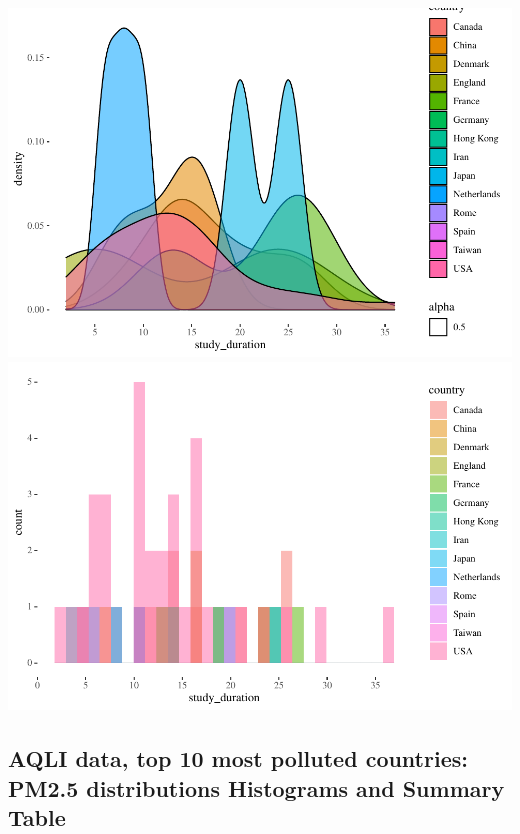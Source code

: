 \documentclass[
]{article}
\begin{document}
\includegraphics[width=1\linewidth]{man/figures/README-study_duration_dist_country_wise-1}
\includegraphics[width=1\linewidth]{man/figures/README-study_duration_dist_country_wise-2}

\hypertarget{aqli-data-top-10-most-polluted-countries-pm2.5-distributions-histograms-and-summary-table}{%
\subsection{AQLI data, top 10 most polluted countries: PM2.5
distributions Histograms and Summary
Table}\label{aqli-data-top-10-most-polluted-countries-pm2.5-distributions-histograms-and-summary-table}}
\end{document}
